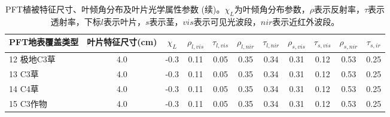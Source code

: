     \begin{sidewaystable}[]
        \centering
        \caption{PFT植被特征尺寸、叶倾角分布及叶片光学属性参数 (续)。$\chi_L$为叶倾角分布参数，$\rho$表示反射率，$\tau$表示透射率，下标$l$表示叶片，$s$表示茎，$vis$表示可见光波段，$nir$表示近红外波段。}
        \label{tab:PFT植被特征尺寸叶倾角分布及叶片光学属性参数2}
            \begin{tabular}{@{}lcccccccccc@{}}
            \toprule
            PFT地表覆盖类型     & 叶片特征尺寸(cm) & $\chi_L$ &$\rho_{l, vis}$ & $\tau_{l, v i s}$  &$\rho_{l,  nir}$ &$\tau_{l,  nir}$ & $\rho_{s, v i s}$ &$\tau_{s, v i s}$ &$\rho_{s,  nir}$ &$\tau_{s,ir}$\\ \midrule
            12 极地C3草 & 4.0 & -0.3 & 0.11 & 0.05 & 0.35 & 0.34 & 0.31 & 0.12 & 0.53 & 0.25 \\
            13 C3草   & 4.0 & -0.3 & 0.11 & 0.05 & 0.35 & 0.34 & 0.31 & 0.12 & 0.53 & 0.25   \\
            14 C4草   & 4.0 & -0.3 & 0.11 & 0.05 & 0.35 & 0.34 & 0.31 & 0.12 & 0.53 & 0.25   \\
            15 C3作物  & 4.0 & -0.3 & 0.11 & 0.05 & 0.35 & 0.34 & 0.31 & 0.12 & 0.53 & 0.25  \\\bottomrule
        \end{tabular}
    \end{sidewaystable}



